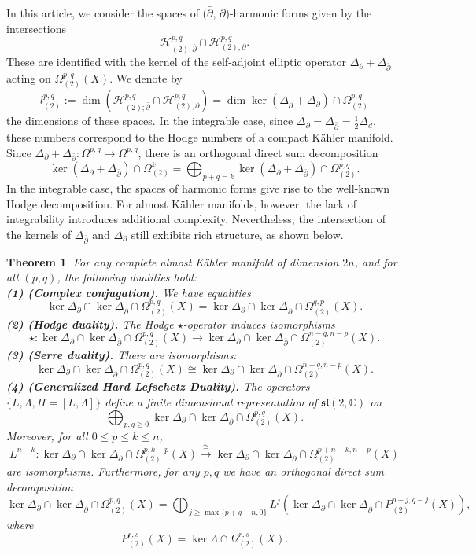 \documentclass[12pt, twoside]{article}
\newtheorem{theorem}{Theorem}[section]
\theoremstyle{definition}
\numberwithin{equation}{section}
\def \C {\mathbb{C}}
\def \De {\Delta}
\def \La {\Lambda}
\def\Om{\Omega}
\def\pa{\partial}
\begin{document}
In this article, we consider the spaces of ($\bar{\pa}$, $\pa$)-harmonic forms given by the intersections
$$\mathcal{H}^{p,q}_{(2);\bar{\pa}}\cap\mathcal{H}^{p,q}_{(2);\pa}.$$
These are identified with the kernel of the self-adjoint elliptic operator $\De_{\pa}+\De_{\bar{\pa}}$ acting on $\Om^{p,q}_{(2)}(X)$. We denote by
	$$l^{p,q}_{(2)}:= \dim (\mathcal{H}^{p,q}_{(2);\bar{\pa}}\cap\mathcal{H}^{p,q}_{(2);\pa})=\dim\ker(\De_{\bar{\pa}}+\De_{\pa})\cap\Om^{p,q}_{(2)}$$
	the dimensions of these spaces. In the integrable case, since $\De_{\pa}=\De_{\bar{\pa}}=\frac{1}{2}\De_{d}$, these numbers correspond to the Hodge numbers of a compact Kähler manifold. Since $\De_{\pa}+\De_{\bar{\pa}}:\Om^{p,q}\rightarrow\Om^{p,q}$, there is an orthogonal direct sum decomposition
	$$\ker(\De_{\pa}+\De_{\bar{\pa}})\cap\Om^{k}_{(2)}=\bigoplus_{p+q=k}\ker(\De_{\pa}+\De_{\bar{\pa}})\cap\Om^{p,q}_{(2)}.$$	
In the integrable case, the spaces of harmonic forms give rise to the well-known Hodge decomposition. For almost Kähler manifolds, however, the lack of integrability introduces additional complexity. Nevertheless, the intersection of the kernels of $\De_{\bar{\pa}}$ and $\De_{\pa}$ still exhibits rich structure, as shown below.	
	\begin{theorem}\label{T4}
	 For any complete almost K\"{a}hler manifold of dimension $2n$, and for all $(p,q)$, the following dualities hold:\\
	\noindent\textbf{(1) (Complex conjugation).} We have equalities
	$$\ker{\De_{\pa}}\cap\ker{\De_{\bar{\pa}}}\cap\Om^{p,q}_{(2)}(X)=\ker{\De_{\pa}}\cap\ker{\De_{\bar{\pa}}}\cap\Om^{q,p}_{(2)}(X).$$
	\noindent\textbf{(2) (Hodge duality).} The Hodge $\star$-operator induces isomorphisms
	$$\star:\ker{\De_{\pa}}\cap\ker{\De_{\bar{\pa}}}\cap\Om^{p,q}_{(2)}(X)\rightarrow\ker{\De_{\pa}}\cap\ker{\De_{\bar{\pa}}}\cap\Om^{n-q,n-p}_{(2)}(X).$$
	\noindent\textbf{(3) (Serre duality).} There are isomorphisms:
	$$\ker{\De_{\pa}}\cap\ker{\De_{\bar{\pa}}}\cap\Om^{p,q}_{(2)}(X)\cong\ker{\De_{\pa}}\cap\ker{\De_{\bar{\pa}}}\cap\Om^{n-q,n-p}_{(2)}(X).$$
	\noindent\textbf{(4) (Generalized Hard Lefschetz Duality).} The operators $\{L,\La,H=[L,\La]\}$ define a finite dimensional representation of $\mathfrak{sl}(2,\C)$ on
		$$\bigoplus_{p,q\geq0}\ker{\De_{\pa}}\cap\ker{\De_{\bar{\pa}}}\cap\Om^{p,q}_{(2)}(X).$$
		Moreover, for all $0\leq p\leq k\leq n$,
		$$L^{n-k}:\ker{\De_{\pa}}\cap\ker{\De_{\bar{\pa}}}\cap\Om^{p,k-p}_{(2)}(X)\stackrel{\cong}{\longrightarrow}\ker{\De_{\pa}}\cap\ker{\De_{\bar{\pa}}}\cap\Om^{p+n-k,n-p}_{(2)}(X)$$
		are isomorphisms. Furthermore, for any $p,q$ we have an orthogonal direct sum decomposition
		$$\ker{\De_{\pa}}\cap\ker{\De_{\bar{\pa}}}\cap\Om^{p,q}_{(2)}(X)=\bigoplus_{j\geq\max\{p+q-n,0\}}L^{j}(\ker{\De_{\pa}}\cap\ker{\De_{\bar{\pa}}}\cap P^{p-j,q-j}_{(2)}(X)),$$
		where $$P^{r,s}_{(2)}(X)=\ker\La\cap\Om^{r,s}_{(2)}(X).$$
	\end{theorem}
\end{document}

